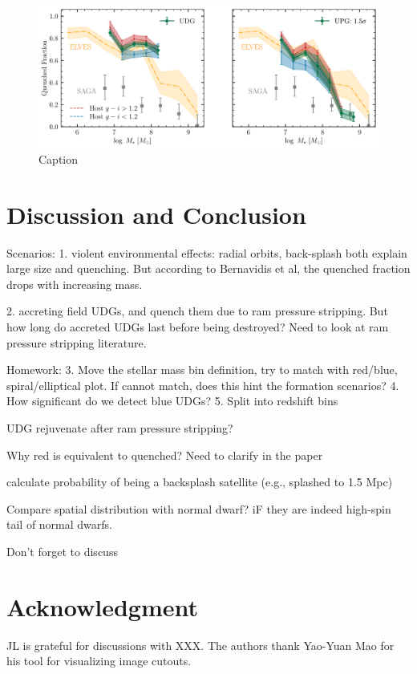 \documentclass[twocolumn,astrosymb,twocolappendix]{aastex631}
\begin{document}
\begin{CJK*}{UTF8}{gbsn}
\begin{figure}
	\vbox{ 
		\centering
		\includegraphics[width=1\linewidth]{quenched_frac_host_color.pdf}
	}
    \caption{Caption}
    \label{fig:qfrac_host_color}
\end{figure}

\section{Discussion and Conclusion}
Scenarios:
1. violent environmental effects: radial orbits, back-splash both explain large size and quenching. But according to Bernavidis et al, the quenched fraction drops with increasing mass. 

2. accreting field UDGs, and quench them due to ram pressure stripping. But how long do accreted UDGs last before being destroyed? Need to look at ram pressure stripping literature.

Homework:
3. Move the stellar mass bin definition, try to match with red/blue, spiral/elliptical plot. If cannot match, does this hint the formation scenarios?
4. How significant do we detect blue UDGs? 
5. Split into redshift bins


UDG rejuvenate after ram pressure stripping?

Why red is equivalent to quenched? Need to clarify in the paper

calculate probability of being a backsplash satellite (e.g., splashed to 1.5 Mpc)

Compare spatial distribution with normal dwarf? iF they are indeed high-spin tail of normal dwarfs. 

Don't forget to discuss \citep{xSAGA-I}


\section*{Acknowledgment}
JL is grateful for discussions with XXX. The authors thank Yao-Yuan Mao for his tool for visualizing image cutouts. 


\end{CJK*}
\end{document}
